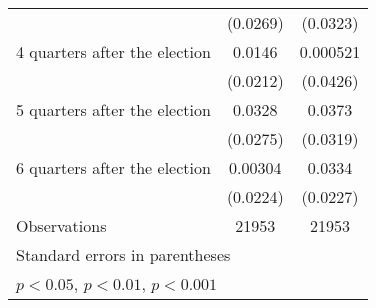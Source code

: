 \begin{table}[htbp]
\begin{tabular}{l*{2}{c}}
                    &    (0.0269)         &    (0.0323)         \\
[1em]
 4 quarters after the election&      0.0146         &    0.000521         \\
                    &    (0.0212)         &    (0.0426)         \\
[1em]
 5 quarters after the election&      0.0328         &      0.0373         \\
                    &    (0.0275)         &    (0.0319)         \\
[1em]
 6 quarters after the election&     0.00304         &      0.0334         \\
                    &    (0.0224)         &    (0.0227)         \\
\hline
Observations        &       21953         &       21953         \\
\hline\hline
\multicolumn{3}{l}{\footnotesize Standard errors in parentheses}\\
\multicolumn{3}{l}{\footnotesize \sym{*} \(p<0.05\), \sym{**} \(p<0.01\), \sym{***} \(p<0.001\)}\\
\end{tabular}
\end{table}
